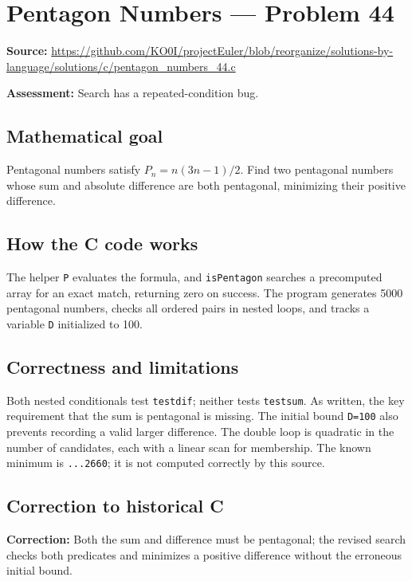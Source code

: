 \section{Pentagon Numbers --- Problem 44}
\label{prob:44}
\noindent\textbf{Source:} \url{https://github.com/KO0I/projectEuler/blob/reorganize/solutions-by-language/solutions/c/pentagon_numbers_44.c}

\noindent\textbf{Assessment:} Search has a repeated-condition bug.

\subsection*{Mathematical goal}
Pentagonal numbers satisfy \(P_n=n(3n-1)/2\). Find two pentagonal numbers whose sum and absolute difference are both pentagonal, minimizing their positive difference.

\subsection*{How the C code works}
The helper \verb|P| evaluates the formula, and \verb|isPentagon| searches a precomputed array for an exact match, returning zero on success. The program generates 5000 pentagonal numbers, checks all ordered pairs in nested loops, and tracks a variable \verb|D| initialized to 100.

\subsection*{Correctness and limitations}
Both nested conditionals test \verb|testdif|; neither tests \verb|testsum|. As written, the key requirement that the sum is pentagonal is missing. The initial bound \verb|D=100| also prevents recording a valid larger difference. The double loop is quadratic in the number of candidates, each with a linear scan for membership. The known minimum is \texttt{...2660}; it is not computed correctly by this source.


\subsection*{Correction to historical C}
{\color{red}\textbf{Correction:} Both the sum and difference must be pentagonal; the revised search checks both predicates and minimizes a positive difference without the erroneous initial bound.}
